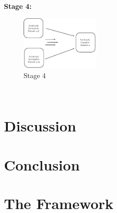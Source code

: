 \documentclass{IEEEconf}
\begin{document}
		\\
		\indent \textbf{Stage 4:}
		\begin{figure}[!ht]
			\caption{Stage 4}
			\centering
			\includegraphics[width=0.35\textwidth]{stage42.pdf}
		\end{figure}
		\\

	\section{Discussion} %
	\label{sec:discussion}
		

	\section{Conclusion} %
	\label{sec:conclusion}
		


	\section{The Framework} %
	\label{sec:the_framework}
\end{document}
